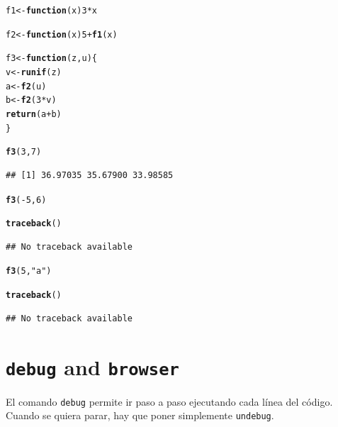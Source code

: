 \documentclass{config/apuntes}\usepackage[]{graphicx}\usepackage[]{xcolor}
\makeatletter
\newcommand{\hlnum}[1]{\textcolor[rgb]{0.686,0.059,0.569}{#1}}%
\newcommand{\hlsng}[1]{\textcolor[rgb]{0.192,0.494,0.8}{#1}}%
\newcommand{\hlopt}[1]{\textcolor[rgb]{0,0,0}{#1}}%
\newcommand{\hldef}[1]{\textcolor[rgb]{0.345,0.345,0.345}{#1}}%
\newcommand{\hlkwa}[1]{\textcolor[rgb]{0.161,0.373,0.58}{\textbf{#1}}}%
\newcommand{\hlkwb}[1]{\textcolor[rgb]{0.69,0.353,0.396}{#1}}%
\newcommand{\hlkwc}[1]{\textcolor[rgb]{0.333,0.667,0.333}{#1}}%
\newcommand{\hlkwd}[1]{\textcolor[rgb]{0.737,0.353,0.396}{\textbf{#1}}}%
\newenvironment{kframe}{%
 \def\at@end@of@kframe{}%
 \ifinner\ifhmode%
  \def\at@end@of@kframe{\end{minipage}}%
  \begin{minipage}{\columnwidth}%
 \fi\fi%
 \def\FrameCommand##1{\hskip\@totalleftmargin \hskip-\fboxsep
 \colorbox{shadecolor}{##1}\hskip-\fboxsep
     \hskip-\linewidth \hskip-\@totalleftmargin \hskip\columnwidth}%
 \MakeFramed {\advance\hsize-\width
   \@totalleftmargin\z@ \linewidth\hsize
   \@setminipage}}%
 {\par\unskip\endMakeFramed%
 \at@end@of@kframe}
\newenvironment{knitrout}{}{} %
\newcommand{\code}[1]{\texttt{#1}}
\makeatother
\begin{document}
\begin{knitrout}
\color{fgcolor}\begin{kframe}
\begin{alltt}
\hldef{f1} \hlkwb{<-} \hlkwa{function}\hldef{(}\hlkwc{x}\hldef{)} \hlnum{3} \hlopt{*} \hldef{x}

\hldef{f2} \hlkwb{<-} \hlkwa{function}\hldef{(}\hlkwc{x}\hldef{)} \hlnum{5} \hlopt{+} \hlkwd{f1}\hldef{(x)}

\hldef{f3} \hlkwb{<-} \hlkwa{function}\hldef{(}\hlkwc{z}\hldef{,} \hlkwc{u}\hldef{) \{}
    \hldef{v} \hlkwb{<-} \hlkwd{runif}\hldef{(z)}
    \hldef{a} \hlkwb{<-} \hlkwd{f2}\hldef{(u)}
    \hldef{b} \hlkwb{<-} \hlkwd{f2}\hldef{(}\hlnum{3} \hlopt{*} \hldef{v)}
    \hlkwd{return}\hldef{(a} \hlopt{+} \hldef{b)}
\hldef{\}}

\hlkwd{f3}\hldef{(}\hlnum{3}\hldef{,} \hlnum{7}\hldef{)}
\end{alltt}
\begin{verbatim}
## [1] 36.97035 35.67900 33.98585
\end{verbatim}
\begin{alltt}
\hlkwd{f3}\hldef{(}\hlopt{-}\hlnum{5}\hldef{,} \hlnum{6}\hldef{)}
\end{alltt}


{\ttfamily\noindent\bfseries\color{errorcolor}{\#\# Error in runif(z): invalid arguments}}\begin{alltt}
\hlkwd{traceback}\hldef{()}
\end{alltt}
\begin{verbatim}
## No traceback available
\end{verbatim}
\begin{alltt}
\hlkwd{f3}\hldef{(}\hlnum{5}\hldef{,} \hlsng{"a"}\hldef{)}
\end{alltt}


{\ttfamily\noindent\bfseries\color{errorcolor}{\#\# Error in 3 * x: argumento no-numérico para operador binario}}\begin{alltt}
\hlkwd{traceback}\hldef{()}
\end{alltt}
\begin{verbatim}
## No traceback available
\end{verbatim}
\end{kframe}
\end{knitrout}

\section{\code{debug} and \code{browser}}
El comando \code{debug} permite ir paso a paso ejecutando cada línea del código. Cuando se quiera parar, hay que poner simplemente \code{undebug}.
\end{document}
